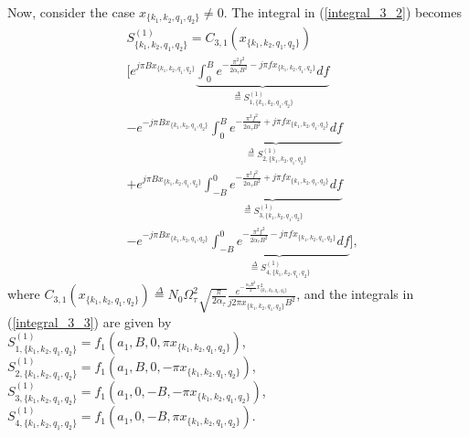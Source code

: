 Now, consider the case $x_{\{k_1,k_2,q_1,q_2\}} \neq 0$. 
The integral in (\ref{integral_3_2}) becomes
\begin{align}
&S_{\{k_1,k_2,q_1,q_2\}}^{(1)}=C_{3,1}(x_{\{k_1,k_2,q_1,q_2\}}) \nonumber \\
&\Bigg[e^{j\pi Bx_{\{k_1,k_2,q_1,q_2\}}}\underbrace{\int_{0}^{B}e^{-\frac{\pi^{2}f^{2}}{2\alpha_{\tau} B^{2}}-j\pi fx_{\{k_1,k_2,q_1,q_2\}}}df}_{\overset{\Delta}{=}S_{1,\{k_1,k_2,q_1,q_2\}}^{(1)}} \nonumber \\
& -e^{-j\pi Bx_{\{k_1,k_2,q_1,q_2\}}}\underbrace{\int_{0}^{B}e^{-\frac{\pi^{2}f^{2}}{2\alpha_{\tau} B^{2}}+j\pi fx_{\{k_1,k_2,q_1,q_2\}}}df}_{\overset{\Delta}{=}S_{2,\{k_1,k_2,q_1,q_2\}}^{(1)}} \nonumber \\
&+e^{j\pi Bx_{\{k_1,k_2,q_1,q_2\}}}\underbrace{\int_{-B}^{0}e^{-\frac{\pi^{2}f^{2}}{2\alpha_{\tau} B^{2}}+j\pi fx_{\{k_1,k_2,q_1,q_2\}}}df}_{\overset{\Delta}{=}S_{3,\{k_1,k_2,q_1,q_2\}}^{(1)}} \nonumber \\
& -e^{-j\pi Bx_{\{k_1,k_2,q_1,q_2\}}}\underbrace{\int_{-B}^{0}e^{-\frac{\pi^{2}f^{2}}{2\alpha_{\tau} B^{2}}-j\pi fx_{\{k_1,k_2,q_1,q_2\}}}df}_{\overset{\Delta}{=}S_{4,\{k_1,k_2,q_1,q_2\}}^{(1)}} \Bigg],
\label{integral_3_3}
\end{align}
where $C_{3,1}(x_{\{k_1,k_2,q_1,q_2\}})\overset{\Delta}{=}N_{0}\Omega_{\tau}^{2}\sqrt{\frac{\pi}{2\alpha_{\tau}}}\frac{e^{-\frac{\alpha_{\tau}B^{2}}{2}x_{\{k_1,k_2,q_1,q_2\}}^{2}}}{j2\pi x_{\{k_1,k_2,q_1,q_2\}}B^{2}}$, and the integrals in (\ref{integral_3_3}) are given by \\
$S_{1,\{k_1,k_2,q_1,q_2\}}^{(1)}=f_1\left(a_1, B,0,\pi x_{\{k_1,k_2,q_1,q_2\}}\right)$, \\
$S_{2,\{k_1,k_2,q_1,q_2\}}^{(1)}=f_1\left(a_1, B,0,-\pi x_{\{k_1,k_2,q_1,q_2\}}\right)$, \\
$S_{3,\{k_1,k_2,q_1,q_2\}}^{(1)}=f_1\left(a_1, 0,-B,-\pi x_{\{k_1,k_2,q_1,q_2\}}\right)$, \\
$S_{4,\{k_1,k_2,q_1,q_2\}}^{(1)}=f_1\left(a_1, 0,-B,\pi x_{\{k_1,k_2,q_1,q_2\}}\right)$. \\  

